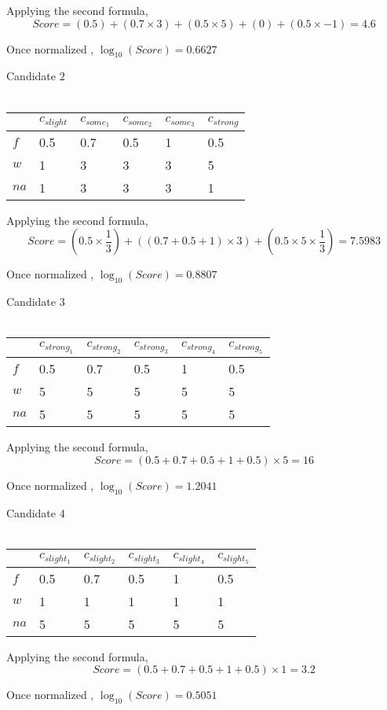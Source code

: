 \documentclass[11pt]{article}
\begin{document}
\begin{large}
Applying the second formula, \\
$$Score = (0.5) + (0.7 \times 3) + (0.5 \times 5) + (0) + (0.5 \times -1) = 4.6 $$

Once normalized , $\log_{10}(Score) = 0.6627 $

Candidate $2$ \\ \\
\begin{tabular}{|l|l|l|l|l|l|}
\hline
  & $c_{slight}$  & $c_{some_{1}}$  & $c_{some_{2}}$  & $c_{some_{3}}$ & $c_{strong}$  \\ \hline
$f$ & 0.5 & 0.7 & 0.5 & 1  & 0.5 \\ \hline
$w$ & 1   & 3   & 3   & 3  & 5  \\ \hline
$na$ & 1  & 3  & 3  & 3 & 1  \\ \hline
\end{tabular}

Applying the second formula, \\
$$Score = (0.5 \times \frac{1}{3}) + ((0.7+0.5+1) \times 3) +  (0.5 \times 5 \times \frac{1}{3}) = 7.5983 $$

Once normalized , $\log_{10}(Score) = 0.8807 $

Candidate $3$ \\ \\
\begin{tabular}{|l|l|l|l|l|l|}
\hline
  & $c_{strong_{1}}$  & $c_{strong_{2}}$  & $c_{strong_{3}}$  & $c_{strong_{4}}$ & $c_{strong_{5}}$  \\ \hline
$f$ & 0.5 & 0.7 & 0.5 & 1  & 0.5 \\ \hline
$w$ & 5   & 5   & 5   & 5  & 5  \\ \hline
$na$ & 5  & 5  & 5  & 5 & 5  \\ \hline
\end{tabular}

Applying the second formula, \\
$$Score = (0.5 + 0.7 +0.5 +1 + 0.5) \times 5 = 16 $$

Once normalized , $\log_{10}(Score) = 1.2041 $

Candidate $4$ \\ \\
\begin{tabular}{|l|l|l|l|l|l|}
\hline
  & $c_{slight_{1}}$  & $c_{slight_{2}}$  & $c_{slight_{3}}$  & $c_{slight_{4}}$ & $c_{slight_{5}}$  \\ \hline
$f$ & 0.5 & 0.7 & 0.5 & 1  & 0.5 \\ \hline
$w$ & 1   & 1   & 1   & 1  & 1  \\ \hline
$na$ & 5  & 5  & 5  & 5 & 5  \\ \hline
\end{tabular}

Applying the second formula, \\
$$Score = (0.5 + 0.7 +0.5 +1 + 0.5) \times 1 = 3.2 $$

Once normalized , $\log_{10}(Score) =  0.5051$ \\ \\

\end{large}
\end{document}
